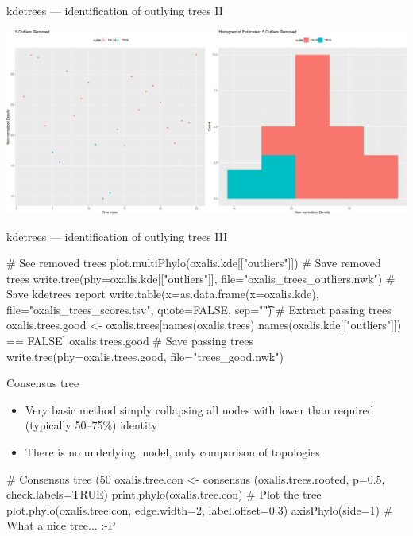 \documentclass[compress, ucs, xelatex, 11pt, xcolor=svgnames, aspectratio=169,
	hyperref={
		bookmarks=true,
		unicode=true,
		colorlinks=true,
		pdftitle={Molecular data in R},
		plainpages=false,
		pdfauthor={Vojtech Zeisek},
		pdfsubject={Course about phylogeny and evolution in R},
		pdfcreator={XeLaTeX},
		pdfkeywords={R, evolution, phylogeny, molecular data},
		linkcolor=Crimson, %
		anchorcolor=Magenta, %
		citecolor=Magenta, %
		filecolor=Magenta, %
		menucolor=Magenta, %
		urlcolor=DodgerBlue, %
		pdftex},
	url={hyphens, lowtilde} %
	]{beamer}
\renewcommand{\texttt}[1]{\colorbox{Beige}{{\ttfamily #1}}}
\begin{document}
\begin{frame}{kdetrees --- identification of outlying trees II}
	\begin{center}
		\includegraphics[width=\textwidth-1cm]{kdetrees.png}
	\end{center}
\end{frame}

\begin{frame}[fragile]{kdetrees --- identification of outlying trees III}
	\begin{spluscode}
    # See removed trees
    plot.multiPhylo(oxalis.kde[["outliers"]])
    # Save removed trees
    write.tree(phy=oxalis.kde[["outliers"]], file="oxalis_trees_outliers.nwk")
    # Save kdetrees report
    write.table(x=as.data.frame(x=oxalis.kde), file="oxalis_trees_scores.tsv",
      quote=FALSE, sep="\t")
    # Extract passing trees
    oxalis.trees.good <- oxalis.trees[names(oxalis.trees) %
      names(oxalis.kde[["outliers"]]) == FALSE]
    oxalis.trees.good
    # Save passing trees
    write.tree(phy=oxalis.trees.good, file="trees_good.nwk")
	\end{spluscode}
\end{frame}

\begin{frame}[fragile]{Consensus tree}
	\begin{multicols}{2}
		\begin{center}
			\texttt{[image: oxalis-cons.png]}
		\end{center}
		\begin{itemize}
		 \item Very basic method simply collapsing all nodes with lower than required (typically 50--75\%) identity
		 \item There is no underlying model, only comparison of topologies
		\end{itemize}
		\begin{spluscode}
    # Consensus tree (50%
    oxalis.tree.con <- consensus
      (oxalis.trees.rooted, p=0.5,
      check.labels=TRUE)
    print.phylo(oxalis.tree.con)
    # Plot the tree
    plot.phylo(oxalis.tree.con,
      edge.width=2, label.offset=0.3)
    axisPhylo(side=1)
    # What a nice tree... :-P
		\end{spluscode}
	\end{multicols}
\end{frame}
\end{document}
